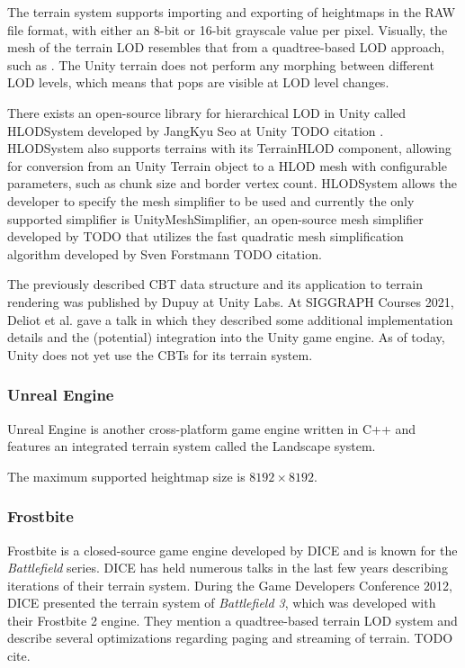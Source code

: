 The terrain system supports importing and exporting of heightmaps in 
the RAW file format, with either an 8-bit or 16-bit grayscale value per pixel.
Visually, the mesh of the terrain LOD resembles that from a quadtree-based LOD approach, such as \cite{chunkedlod}.
The Unity terrain does not perform any morphing between different LOD levels,
which means that pops are visible at LOD level changes.

There exists an open-source library for hierarchical LOD in Unity called HLODSystem developed by JangKyu Seo at Unity TODO citation .
HLODSystem also supports terrains with its TerrainHLOD component, allowing for conversion from an Unity Terrain object to a HLOD mesh with configurable parameters, such as chunk size and border vertex count.
HLODSystem allows the developer to specify the mesh simplifier to be used and currently the only supported simplifier is UnityMeshSimplifier, 
an open-source mesh simplifier developed by TODO that utilizes the fast quadratic mesh simplification algorithm developed by Sven Forstmann TODO citation.

The previously described CBT data structure and its application to terrain rendering was published by Dupuy 
at Unity Labs. 
At SIGGRAPH Courses 2021, Deliot et al. gave a talk in which they described some additional implementation details 
and the (potential) integration into the Unity game engine. As of today, Unity does not yet use 
the CBTs for its terrain system.

\subsubsection{Unreal Engine}
Unreal Engine is another cross-platform game engine written in C++ and features
an integrated terrain system called the Landscape system.

The maximum supported heightmap size is $8192 \times 8192$.


\subsubsection{Frostbite}
Frostbite is a closed-source game engine developed by DICE and is known for the \textit{Battlefield} series.
DICE has held numerous talks in the last few years describing iterations of their
terrain system.
During the Game Developers Conference 2012, DICE presented the terrain system of \textit{Battlefield 3}, which was developed with their Frostbite 2 engine.
They mention a quadtree-based terrain LOD system and describe several optimizations regarding paging and streaming of terrain.
TODO cite.

